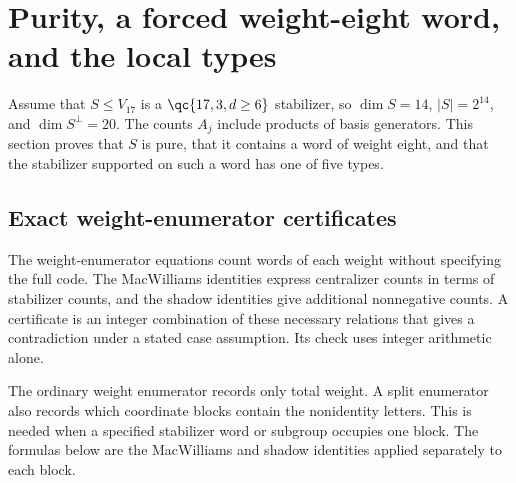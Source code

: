 \section{Purity, a forced weight-eight word, and the local types}\label{sec:forced}

Assume that \(S\leq V_{17}\) is a \(\qc{17,3,d\geq6}\)
stabilizer, so \(\dim S=14\), \(|S|=2^{14}\), and \(\dim S^\perp=20\).
The counts \(A_j\) include products of basis generators.
This section proves that \(S\) is pure, that it contains a word of
weight eight, and that the stabilizer supported on such a word has one
of five types.

\subsection{Exact weight-enumerator certificates}\label{sec:certificates}

The weight-enumerator equations count words of each weight without
specifying the full code. The MacWilliams identities express centralizer
counts in terms of stabilizer counts, and the shadow identities give
additional nonnegative counts. A certificate is an integer combination
of these necessary relations that gives a contradiction under a stated
case assumption. Its check uses integer arithmetic alone.

The ordinary weight enumerator records only total weight. A split
enumerator also records which coordinate blocks contain the nonidentity
letters. This is needed when a specified stabilizer word or subgroup
occupies one block. The formulas below are the MacWilliams and shadow
identities applied separately to each block.

